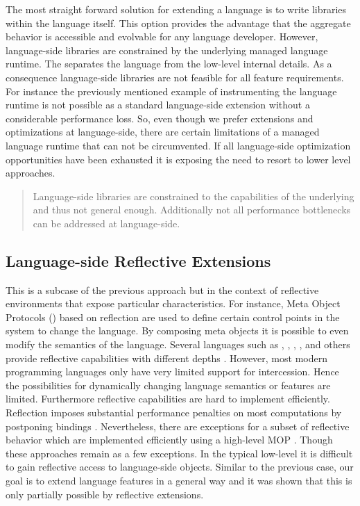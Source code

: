 The most straight forward solution for extending a language is to write libraries within the language itself. 
This option provides the advantage that the aggregate behavior is accessible and evolvable for any language developer.
However, language-side libraries are constrained by the underlying managed language runtime.
The \VM separates the language from the low-level internal details.
As a consequence language-side libraries are not feasible for all feature requirements.
For instance the previously mentioned example of instrumenting the language runtime is not possible as a standard language-side extension without a considerable performance loss.
So, even though we prefer extensions and optimizations at language-side, there are certain limitations of a managed language runtime that can not be circumvented.
If all language-side optimization opportunities have been exhausted it is exposing the need to resort to lower level approaches.

\begin{quote}
Language-side libraries are constrained to the capabilities of the underlying \VM and thus not general enough. 
Additionally not all performance bottlenecks can be addressed at language-side.
\end{quote}

\subsection{Language-side Reflective Extensions}

This is a subcase of the previous approach but in the context of reflective environments that expose particular characteristics.
For instance, Meta Object Protocols (\MOP) \cite{Kicz91a} based on reflection \cite{Maes87a} are used to define certain control points in the system to change the language.
By composing meta objects it is possible to even modify the semantics of the language. 
Several languages such as \PH, \ST, , , and others provide reflective capabilities with different depths \cite{Ande98a,Van10a}.
However, most modern programming languages only have very limited support for intercession.
Hence the possibilities for dynamically changing language semantics or features are limited. 
Furthermore reflective capabilities are hard to implement efficiently.
Reflection imposes substantial performance penalties on most computations by postponing bindings \cite{Male96a}. 
Nevertheless, there are exceptions for a subset of reflective behavior which are implemented efficiently using a high-level MOP \cite{Vran12a}.
Though these approaches remain as a few exceptions.
In the typical low-level \VM it is difficult to gain reflective access to language-side objects.
Similar to the previous case, our goal is to extend language features in a general way and it was shown that this is only partially possible by reflective extensions. 

